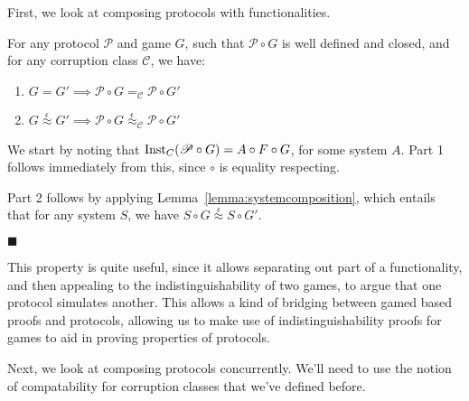 First, we look at composing protocols with functionalities.

\begin{theorem}
  \label{thm:vertical_composition_theorem}
  For any protocol $\mathscr{P}$ and game $G$, such that $\mathscr{P} \circ G$
  is well defined and closed, and for any corruption class $\mathscr{C}$, we have:
  \begin{enumerate}
    \item $G = G' \implies \mathscr{P} \circ G =_{\mathscr{C}} \mathscr{P} \circ G'$
    \item $G \overset{\epsilon}{\approx} G' \implies \mathscr{P} \circ G \overset{\epsilon}{\approx}_{\mathscr{C}} \mathscr{P} \circ G'$
  \end{enumerate}
  
 We start by noting that $\text{Inst}_C(\mathscr{P} \circ G) = A \circ F \circ G$,
for some system $A$.
Part 1 follows immediately from this, since $\circ$ is equality respecting.

Part 2 follows by applying Lemma~\ref{lemma:systemcomposition},
which entails that for any system $S$, we have $S \circ G \overset{\epsilon}{\approx} S \circ G'$.

$\blacksquare$
\end{theorem}

This property is quite useful, since it allows separating out part
of a functionality, and then appealing to the indistinguishability
of two games, to argue that one protocol simulates another.
This allows a kind of bridging between gamed based proofs
and protocols, allowing us to make
use of indistinguishability proofs for games to aid
in proving properties of protocols.

Next, we look at composing protocols concurrently.
We'll need to use the notion of compatability for corruption
classes that we've defined before.

